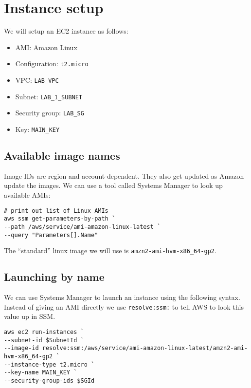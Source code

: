\documentclass{pgnotes}
\begin{document}
\section{Instance setup}\label{instance-setup}

We will setup an EC2 instance as follows:

\begin{itemize}
\item
  AMI: Amazon Linux
\item
  Configuration: \texttt{t2.micro}
\item
  VPC: \texttt{LAB\_VPC}
\item
  Subnet: \texttt{LAB\_1\_SUBNET}
\item
  Security group: \texttt{LAB\_SG}
\item
  Key: \texttt{MAIN\_KEY}
\end{itemize}


\subsection{Available image names}\label{available-image-names}

Image IDs are region and account-dependent. They also get updated as
Amazon update the images.
We can use a tool called Systems Manager to look up available AMIs:

\begin{verbatim}
# print out list of Linux AMIs
aws ssm get-parameters-by-path `
--path /aws/service/ami-amazon-linux-latest `
--query "Parameters[].Name"
\end{verbatim}

The ``standard'' linux image we will use is \texttt{amzn2-ami-hvm-x86\_64-gp2}.

\subsection{Launching by name}\label{launching-by-name}

We can use Systems Manager to launch an instance using the following
syntax. Instead of giving an AMI directly we use \texttt{resolve:ssm:}
to tell AWS to look this value up in SSM.

\begin{verbatim}
aws ec2 run-instances `
--subnet-id $SubnetId `
--image-id resolve:ssm:/aws/service/ami-amazon-linux-latest/amzn2-ami-hvm-x86_64-gp2 `
--instance-type t2.micro `
--key-name MAIN_KEY `
--security-group-ids $SGId
\end{verbatim}
\end{document}
